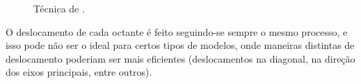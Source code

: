     \begin{figure}[!ht]
    	\centering
    	\qquad
    	\caption{Técnica de \cite{bib:Lohner01}.}
    	\label{fig:lohner}
    \end{figure}
    
    O deslocamento de cada octante é feito seguindo-se sempre o mesmo processo, e isso pode não ser o ideal para certos tipos de modelos, onde maneiras distintas de deslocamento poderiam ser mais eficientes (deslocamentos na diagonal, na direção dos eixos principais, entre outros).
    
